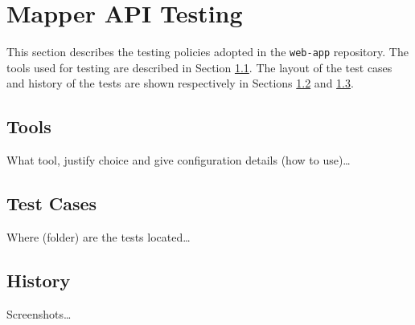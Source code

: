 \documentclass{article}
\begin{document}
    \newpage


    \section{Mapper API Testing}
    \label{sec:mapper-api}

    This section describes the testing policies adopted in the \texttt{web-app}
    repository. The tools used for testing are described in Section
    \ref{sec:api-tools}.  The layout of the test cases and history of the tests
    are shown respectively in Sections \ref{sec:api-cases} and
    \ref{sec:api-hist}.

    \subsection{Tools}
    \label{sec:api-tools}

    What tool, justify choice and give configuration details (how to use)\ldots

    \subsection{Test Cases}
    \label{sec:api-cases}

    Where (folder) are the tests located\ldots

    \subsection{History}
    \label{sec:api-hist}

    Screenshots\ldots
\end{document}
